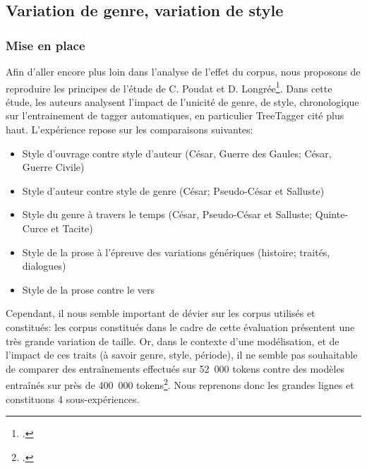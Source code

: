 \subsection{Variation de genre, variation de style}
\label{lemmatisation:extensibilite:prose-vers}

\subsubsection{Mise en place}

Afin d'aller encore plus loin dans l'analyse de l'effet du corpus, nous proposons de reproduire les principes de l'étude de C. Poudat et D. Longrée\footcite{poudat2009variations}. Dans cette étude, les auteurs analysent l'impact de l'unicité de genre, de style, chronologique sur l'entrainement de tagger automatiques, en particulier TreeTagger cité plus haut. L'expérience repose sur les comparaisons suivantes:
\begin{itemize}
    \item Style d'ouvrage contre style d'auteur (César, Guerre des Gaules; César, Guerre Civile)
    \item Style d'auteur contre style de genre (César; Pseudo-César et Salluste)
    \item Style du genre à travers le temps (César, Pseudo-César et Salluste; Quinte-Curce et Tacite)
    \item Style de la prose à l'épreuve des variations génériques (histoire; traités, dialogues)
    \item Style de la prose contre le vers
\end{itemize}{}

Cependant, il nous semble important de dévier sur les corpus utilisés et constitués: les corpus constitués dans le cadre de cette évaluation présentent une très grande variation de taille. Or, dans le contexte d'une modélisation, et de l'impact de ces traits (à savoir genre, style, période), il ne semble pas souhaitable de comparer des entraînements effectués sur 52~000 tokens contre des modèles entraînés sur près de 400~000 tokens\footcite[par exemple, p.~135, 2.~2.~4]{poudat2009variations}. Nous reprenons donc les grandes lignes et constituons 4 sous-expériences.


